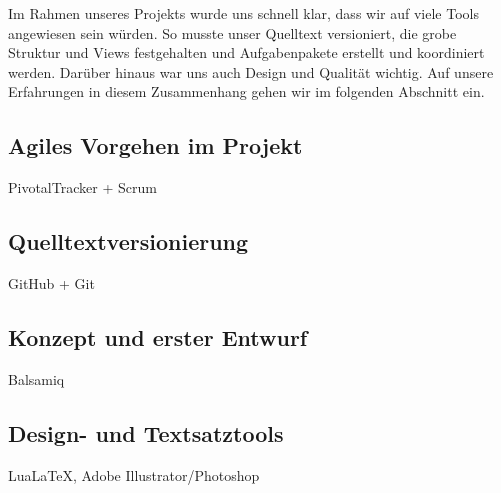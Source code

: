Im Rahmen unseres Projekts wurde uns schnell klar, dass wir auf viele Tools angewiesen sein würden. So musste unser Quelltext versioniert, die grobe Struktur und Views festgehalten und Aufgabenpakete erstellt und koordiniert werden. Darüber hinaus war uns auch Design und Qualität wichtig. Auf unsere Erfahrungen in diesem Zusammenhang gehen wir im folgenden Abschnitt ein.

\subsection{Agiles Vorgehen im Projekt}
PivotalTracker + Scrum
\subsection{Quelltextversionierung}
GitHub + Git
\subsection{Konzept und erster Entwurf}
Balsamiq
\subsection{Design- und Textsatztools}
Lua\LaTeX{}, Adobe Illustrator/Photoshop